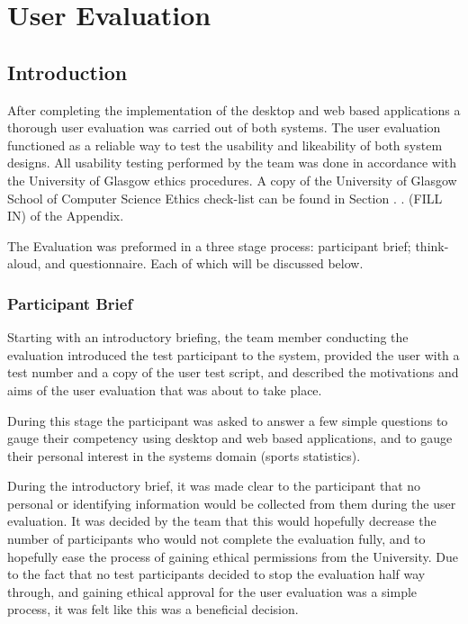 \section{User Evaluation}

\subsection{Introduction}

After completing the implementation of the desktop and web based applications a 
thorough user evaluation was carried out of both systems. The user evaluation 
functioned as a reliable way to test the usability and likeability of both 
system designs. All usability testing performed by the team was done in 
accordance with the University of Glasgow ethics procedures. A copy of the 
University of Glasgow School of Computer Science Ethics check-list can be found 
in Section . . (FILL IN) of the Appendix. 

The Evaluation was preformed in a three stage process: participant brief;
think-aloud, and questionnaire. Each of which will be discussed below.

\subsubsection{Participant Brief}

Starting with an introductory briefing, the team member conducting the 
evaluation introduced the test participant to the system, provided the user 
with a test number and a copy of the user test script, and described the 
motivations and aims of the user evaluation that was about to take place.  

During this stage the participant was asked to answer a few simple questions to 
gauge their competency using desktop and web based applications, and to gauge 
their personal interest in the systems domain (sports statistics).

During the introductory brief, it was made clear to the participant that no 
personal or identifying information would be collected from them during the 
user evaluation. It was decided by the team that this would hopefully decrease 
the number of participants who would not complete the evaluation fully, and to 
hopefully ease the process of gaining ethical permissions from the University. 
Due to the fact that no test participants decided to stop the evaluation half 
way through, and gaining ethical approval for the user evaluation was a simple 
process, it was felt like this was a beneficial decision. 


